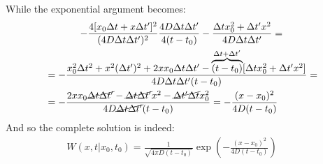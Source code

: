 \documentclass[../template.tex]{subfiles}
\begin{document}
\begin{exo}
    While the exponential argument becomes:
    \begin{align*}
        -\frac{4 [x_0 \Delta t + x \Delta t']^2}{(4D \Delta t \Delta t' )^2} \frac{4D \Delta t \Delta t'}{4 (t-t_0)}  - \frac{\Delta t x_0^2 + \Delta t' x^2}{4D \Delta t \Delta t'} = \span \\
        &= -\frac{x_0^2 \Delta t^2 + x^2 (\Delta t')^2 + 2x x_0 \Delta t \Delta t' - \overbrace{(t-t_0)}^{\Delta t+ \Delta t'}[\Delta t x_0^2 + \Delta t' x^2]  }{4D \Delta t \Delta t' (t-t_0)} =\\
        &=-\frac{2x x_0 \cancel{\Delta t \Delta t' }- \cancel{\Delta t \Delta t' }x^2 - \cancel{\Delta t' \Delta t} x_0^2  }{4D \cancel{\Delta t \Delta t'} (t-t_0)} = - \frac{(x-x_0)^2}{4D (t-t_0)} 
    \end{align*}
    And so the complete solution is indeed:
    \begin{align*}
        W(x,t|x_0,t_0) = \frac{1}{\sqrt{4 \pi D (t-t_0)}}  \exp\left(-\frac{(x - x_0)^2}{4D (t-t_0)} \right) \qquad 
    \end{align*}
\end{exo}
\end{document}
